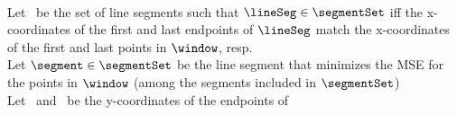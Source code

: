 


\beginAlgorithm
{}
\encodeWindowSizee\\
Let \segmentSet\ be the set of line segments such that $\lineSeg \in \segmentSet$ iff the x-coordinates of the first and last endpoints of $\lineSeg$ match the x-coordinates of the first and last points in $\window$, resp.\\
Let $\segment \in \segmentSet$ be the line segment that minimizes the MSE for the points in $\window$ (among the segments included in $\segmentSet$)\\
Let \sO\ and \sN\ be the y-coordinates of the endpoints of \segment\\
\codeFloat{\sO}\\
\codeFloat{\sN}
